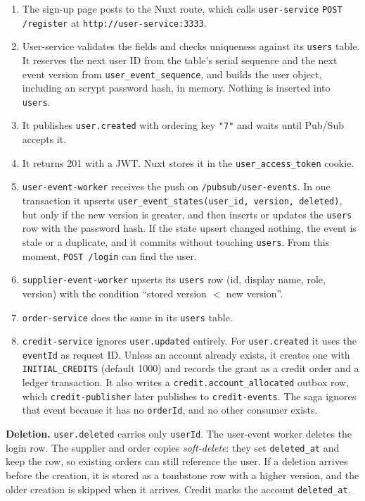 \documentclass[11pt,a4paper]{article}
\newcommand{\code}[1]{\nolinkurl{#1}}
\begin{document}
\begin{enumerate}
  \item The sign-up page posts to the Nuxt route, which calls \code{user-service}
  \code{POST /register} at \code{http://user-service:3333}.
  \item User-service validates the fields and checks uniqueness against its
  \code{users} table. It reserves the next user ID from the table's serial sequence and
  the next event version from \code{user_event_sequence}, and builds the user object,
  including an scrypt password hash, in memory. Nothing is inserted into \code{users}.
  \item It publishes \code{user.created} with ordering key \code{"7"} and waits until
  Pub/Sub accepts it.
  \item It returns 201 with a JWT. Nuxt stores it in the \code{user_access_token} cookie.
  \item \code{user-event-worker} receives the push on \code{/pubsub/user-events}. In one
  transaction it upserts \code{user_event_states(user_id, version, deleted)}, but only if
  the new version is greater, and then inserts or updates the \code{users} row with the
  password hash. If the state upsert changed nothing, the event is stale or a duplicate,
  and it commits without touching \code{users}. From this moment, \code{POST /login} can
  find the user.
  \item \code{supplier-event-worker} upserts its \code{users} row (id, display name,
  role, version) with the condition ``stored version $<$ new version''.
  \item \code{order-service} does the same in its \code{users} table.
  \item \code{credit-service} ignores \code{user.updated} entirely. For
  \code{user.created} it uses the \code{eventId} as request ID. Unless an account already
  exists, it creates one with \code{INITIAL_CREDITS} (default 1000) and records the grant
  as a credit order and a ledger transaction. It also writes a
  \code{credit.account_allocated} outbox row, which \code{credit-publisher} later
  publishes to \code{credit-events}. The saga ignores that event because it has no
  \code{orderId}, and no other consumer exists.
\end{enumerate}

\textbf{Deletion.} \code{user.deleted} carries only \code{userId}. The user-event worker
deletes the login row. The supplier and order copies \emph{soft-delete}: they set
\code{deleted_at} and keep the row, so existing orders can still reference the user.
If a deletion arrives before the creation, it is stored as a tombstone row with a higher
version, and the older creation is skipped when it arrives. Credit marks the account
\code{deleted_at}.
\end{document}
